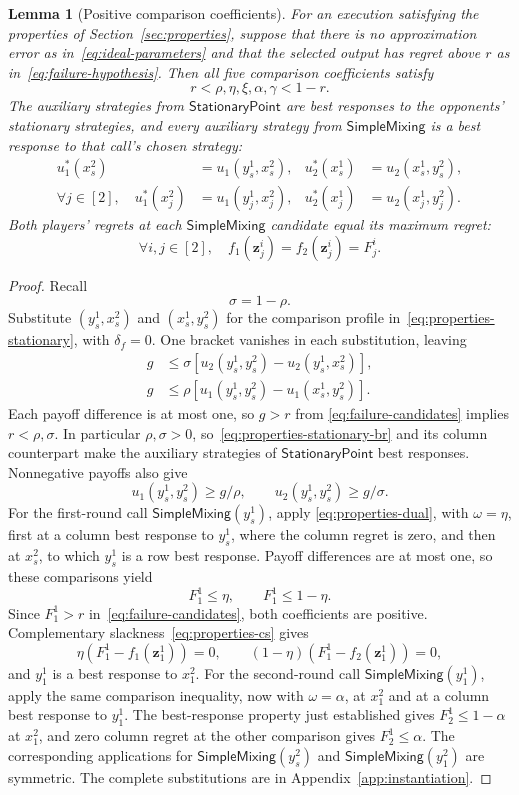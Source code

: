 \documentclass[11pt]{article}
\newtheorem{lemma}[theorem]{Lemma}
\theoremstyle{remark}
\theoremstyle{plain}
\newcommand{\sm}{\mathsf{SimpleMixing}}
\newcommand{\spoint}{\mathsf{StationaryPoint}}
\begin{document}
\begin{lemma}[Positive comparison coefficients]
\label{lem:positive-weights}
For an execution satisfying the properties of
Section~\ref{sec:properties}, suppose that there is no approximation
error as in~\eqref{eq:ideal-parameters} and that the selected output
has regret above $r$ as in~\eqref{eq:failure-hypothesis}.
Then all five comparison coefficients satisfy
\[
 r<\rho,\eta,\xi,\alpha,\gamma<1-r.
\]
The auxiliary strategies from $\spoint$ are best responses to the
opponents' stationary strategies, and every auxiliary strategy from
$\sm$ is a best response to that call's chosen strategy:
\[
 \begin{aligned}
 u_1^*(x_s^2)&=u_1(y_s^1,x_s^2),&u_2^*(x_s^1)&=u_2(x_s^1,y_s^2),\\
 \forall j\in[2],\quad u_1^*(x_j^2)&=u_1(y_j^1,x_j^2),&
 u_2^*(x_j^1)&=u_2(x_j^1,y_j^2).
 \end{aligned}
\]
Both players' regrets at each $\sm$ candidate equal its maximum regret:
\[
 \forall i,j\in[2],\quad f_1(\boldsymbol z_j^i)=f_2(\boldsymbol z_j^i)=F_j^i.
\]
\end{lemma}
\begin{proof}
Recall
\[
 \sigma=1-\rho.
\]
Substitute $(y_s^1,x_s^2)$ and $(x_s^1,y_s^2)$ for the comparison
profile in~\eqref{eq:properties-stationary}, with $\delta_f=0$.
One bracket vanishes in each substitution, leaving
\[
 \begin{aligned}
 g&\le\sigma[u_2(y_s^1,y_s^2)-u_2(y_s^1,x_s^2)],\\
 g&\le\rho[u_1(y_s^1,y_s^2)-u_1(x_s^1,y_s^2)].
 \end{aligned}
\]
Each payoff difference is at most one, so $g>r$ from
\eqref{eq:failure-candidates} implies $r<\rho,\sigma$.
In particular $\rho,\sigma>0$, so~\eqref{eq:properties-stationary-br}
and its column counterpart make the auxiliary strategies of $\spoint$
best responses.
Nonnegative payoffs also give
\begin{equation}
 u_1(y_s^1,y_s^2)\ge g/\rho,\qquad
 u_2(y_s^1,y_s^2)\ge g/\sigma.
 \label{eq:main-stationary-payoff-lower-bounds}
\end{equation}
For the first-round call $\sm(y_s^1)$, apply
\eqref{eq:properties-dual}, with $\omega=\eta$, first at a
column best response to $y_s^1$, where the column regret is zero,
and then at $x_s^2$, to which $y_s^1$ is a row best response.
Payoff differences are at most one, so these comparisons yield
\[
 F_1^1\le\eta,\qquad F_1^1\le1-\eta.
\]
Since $F_1^1>r$ in~\eqref{eq:failure-candidates}, both coefficients are
positive. Complementary slackness~\eqref{eq:properties-cs} gives
\[
 \eta(F_1^1-f_1(\boldsymbol z_1^1))=0,\qquad
 (1-\eta)(F_1^1-f_2(\boldsymbol z_1^1))=0,
\]
and $y_1^1$ is a best response to $x_1^2$.
For the second-round call $\sm(y_1^1)$, apply the same comparison
inequality, now with $\omega=\alpha$, at $x_1^2$ and at a column
best response to $y_1^1$. The best-response property just established
gives $F_2^1\le1-\alpha$ at $x_1^2$, and zero column regret at the
other comparison gives $F_2^1\le\alpha$. The corresponding
applications for $\sm(y_s^2)$ and $\sm(y_1^2)$ are symmetric.
The complete substitutions are in Appendix~\ref{app:instantiation}.
\end{proof}
\end{document}
